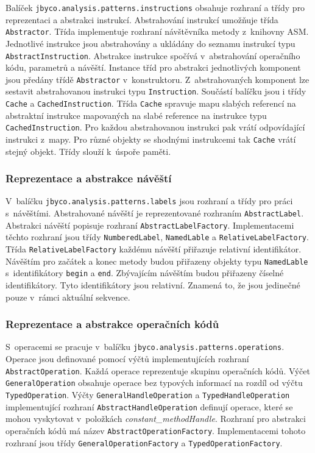 Balíček \texttt{jbyco.analysis.patterns.instructions} obsahuje rozhraní a třídy pro reprezentaci a abstrakci instrukcí. Abstrahování instrukcí umožňuje třída \texttt{Abstractor}. Třída implementuje rozhraní návštěvníka metody z~knihovny ASM. Jednotlivé instrukce jsou abstrahovány a ukládány do seznamu instrukcí typu \texttt{AbstractInstruction}. Abstrakce instrukce spočívá v~abstrahování operačního kódu, parametrů a návěští. Instance tříd pro abstrakci jednotlivých komponent jsou předány třídě \texttt{Abstractor} v~konstruktoru. Z~abstrahovaných komponent lze sestavit abstrahovanou instrukci typu \texttt{Instruction}. Součástí balíčku jsou i třídy \texttt{Cache} a \texttt{CachedInstruction}. Třída \texttt{Cache} spravuje mapu slabých referencí na abstraktní instrukce mapovaných na slabé reference na instrukce typu \texttt{CachedInstruction}. Pro každou abstrahovanou instrukci pak vrátí odpovídající instrukci z~mapy. Pro různé objekty se shodnými instrukcemi tak \texttt{Cache} vrátí stejný objekt. Třídy slouží k~úspoře paměti.

\subsubsection{Reprezentace a abstrakce návěští}

V~balíčku \texttt{jbyco.analysis.patterns.labels} jsou rozhraní a třídy pro práci s~návěštími. Abstrahované návěští je reprezentované rozhraním \texttt{AbstractLabel}. Abstrakci návěští popisuje rozhraní \texttt{AbstractLabelFactory}. Implementacemi těchto rozhraní jsou třídy \texttt{NumberedLabel}, \texttt{NamedLable} a \texttt{RelativeLabelFactory}. Třída \texttt{RelativeLabelFactory} každému návěští přiřazuje relativní identifikátor. Návěštím pro začátek a konec metody budou přiřazeny objekty typu \texttt{NamedLable} s~identifikátory \texttt{begin} a \texttt{end}. Zbývajícím návěštím budou přiřazeny číselné identifikátory. Tyto identifikátory jsou relativní. Znamená to, že jsou jedinečné pouze v~rámci aktuální sekvence.

\subsubsection{Reprezentace a abstrakce operačních kódů}

S~operacemi se pracuje v~balíčku \texttt{jbyco.analysis.patterns.operations}. Operace jsou definované pomocí výčtů implementujících rozhraní \texttt{AbstractOperation}. Každá operace reprezentuje skupinu operačních kódů. Výčet \texttt{GeneralOperation} obsahuje operace bez typových informací na rozdíl od výčtu \texttt{TypedOperation}. Výčty \texttt{GeneralHandleOperation} a \texttt{TypedHandleOperation} implementující rozhraní \texttt{AbstractHandleOperation} definují operace, které se mohou vyskytovat v~položkách \textit{constant\_methodHandle}. Rozhraní pro abstrakci operačních kódů má název \texttt{AbstractOperationFactory}. Implementacemi tohoto rozhraní jsou třídy \texttt{GeneralOperationFactory} a \texttt{TypedOperationFactory}. 


